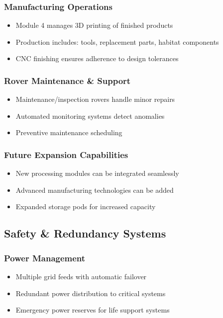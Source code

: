\documentclass[12pt, a4paper]{article}
\begin{document}
\subsubsection{Manufacturing Operations}
\begin{itemize}
    \item Module 4 manages 3D printing of finished products
    \item Production includes: tools, replacement parts, habitat components
    \item CNC finishing ensures adherence to design tolerances
\end{itemize}

\subsubsection{Rover Maintenance \& Support}
\begin{itemize}
    \item Maintenance/inspection rovers handle minor repairs
    \item Automated monitoring systems detect anomalies
    \item Preventive maintenance scheduling
\end{itemize}

\subsubsection{Future Expansion Capabilities}
\begin{itemize}
    \item New processing modules can be integrated seamlessly
    \item Advanced manufacturing technologies can be added
    \item Expanded storage pods for increased capacity
\end{itemize}

\subsection{Safety \& Redundancy Systems}

\subsubsection{Power Management}
\begin{itemize}
    \item Multiple grid feeds with automatic failover
    \item Redundant power distribution to critical systems
    \item Emergency power reserves for life support systems
\end{itemize}
\end{document}
